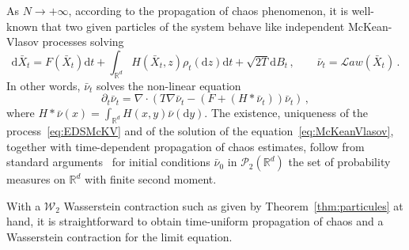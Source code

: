 \documentclass[10pt]{amsart}
\theoremstyle{definition}\newtheorem{defi}[theo]{Definition}\newtheorem{rema}[theo]{Remark}\newtheorem{exam}[theo]{Example}\newtheorem{exem}[theo]{Example}\newtheorem{nota}[theo]{Notation}
\newcommand{\R}{\mathbb R}
\newcommand{\clP}{\mathcal P}
\newcommand{\clW}{\mathcal W}
\newcommand{\clL}{\mathcal L}
\newcommand{\dd}{\mathrm{d}}
\newcommand{\na}{\nabla}
\newcommand{\1}{\mathbbm{1}}
\begin{document}
As $N\rightarrow +\infty$, according to the propagation of chaos phenomenon, it is well-known that two given particles of the system behave like independent McKean-Vlasov processes solving
\begin{equation}\label{eq:EDSMcKV}
\dd \bar X_t = F(\bar X_t) \dd t + \int_{\R^d} H\left(\bar X_t,z\right) \rho_t(\dd z) \dd t + \sqrt{2T} \dd B_t\,,\qquad \bar \nu_t = \clL aw\left(\bar X_t\right)\,.
\end{equation}
In other words, $\bar \nu_t$ solves the non-linear equation
\begin{equation}\label{eq:McKeanVlasov}
\partial_t \bar \nu_t = \na\cdot \left( T\na\bar \nu_t - \left(F+ \left(H\ast \bar \nu_t\right)\right)\bar \nu_t\right) \,,
\end{equation}
where $ H\ast\bar \nu (x) = \int_{\R^d} H(x,y)\bar \nu(\dd y)$. The existence, uniqueness of the process~\eqref{eq:EDSMcKV} and of the solution of the equation~\eqref{eq:McKeanVlasov}, together with time-dependent propagation of chaos estimates, follow from standard arguments~\cite{Meleard,Sznitman} for initial conditions $\bar\nu_0$ in $\clP_2(\R^d)$ the set of probability measures on $\R^d$ with finite second moment.

With a $\clW_2$ Wasserstein contraction such as given by Theorem~\ref{thm:particules} at hand, it is straightforward to obtain time-uniform propagation of chaos and a Wasserstein contraction for the limit equation.
\end{document}
